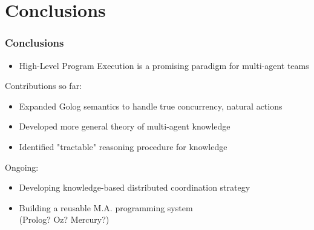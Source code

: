 \documentclass{beamer}
\begin{document}
\section{Conclusions}

\begin{frame}
\frametitle{Conclusions}
\begin{itemize}
  \item High-Level Program Execution is a promising paradigm for multi-agent teams
\end{itemize}
\pause
Contributions so far:
\begin{itemize}
  \item Expanded Golog semantics to handle true concurrency, natural actions
  \item Developed more general theory of multi-agent knowledge
  \item Identified "tractable" reasoning procedure for knowledge
\end{itemize}
\pause
Ongoing:
\begin{itemize}
  \item Developing knowledge-based distributed coordination strategy
  \item Building a reusable M.A. programming system\\(Prolog? Oz? Mercury?)
\end{itemize}
\end{frame}



\end{document}
